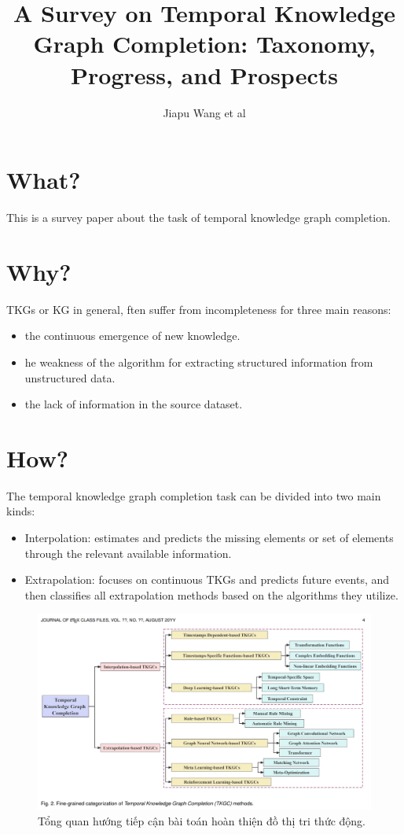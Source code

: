 \documentclass[12pt]{article}
\begin{document}
\title{A Survey on Temporal Knowledge Graph Completion: Taxonomy, Progress, and Prospects}
\author{Jiapu Wang et al}
\maketitle


\section{What?}

This is a survey paper about the task of temporal knowledge graph completion. 

\section{Why?}

TKGs or KG in general, ften suffer from incompleteness for three main reasons:
\begin{itemize}
    \item the continuous emergence of new knowledge.
    \item he weakness of the algorithm for extracting structured information from unstructured data.
    \item the lack of information in the source dataset.
\end{itemize}

\section{How?}

The temporal knowledge graph completion task can be divided into two main kinds:
\begin{itemize}
    \item Interpolation: estimates and predicts the missing elements or set of elements through the relevant available
    information.
    \item Extrapolation:  focuses on continuous TKGs and predicts future events, and then classifies all extrapolation methods based on the algorithms
    they utilize.
\end{itemize}

\begin{figure}[h!]
    \includegraphics[width=1.1\linewidth]{figures/survey_wang2023_fig01.png}
    \caption{Tổng quan hướng tiếp cận bài toán hoàn thiện đồ thị tri thức động.}
    \label{fig:overview_med_approaches}
\end{figure}
\end{document}
